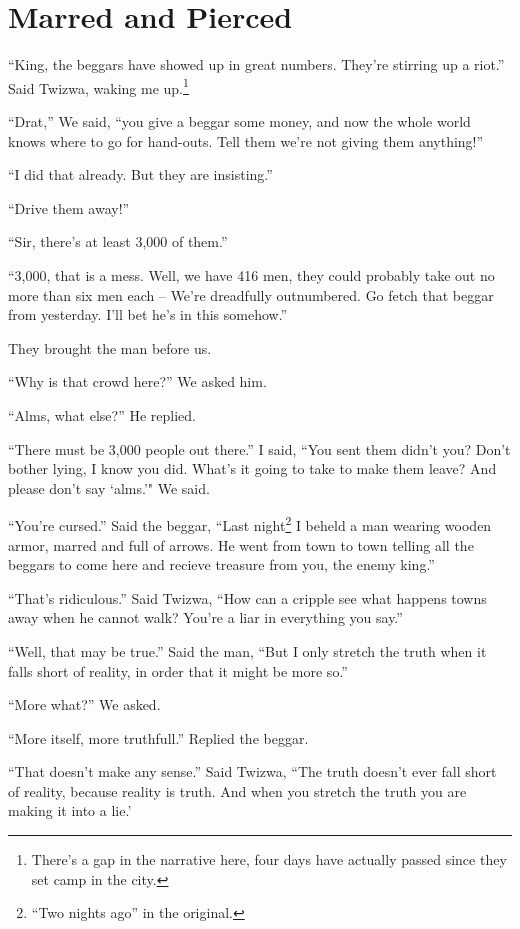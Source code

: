 \chapter {Marred and Pierced}

``King, the beggars have showed up in great numbers. They're stirring up a riot.'' Said Twizwa, waking me up.\footnote{There's a gap in the narrative here, four days have actually passed since they set camp in the city.}

``Drat,'' We said, ``you give a beggar some money, and now the whole world knows where to go for hand-outs. Tell them we're not giving them anything!''

``I did that already. But they are insisting.''

``Drive them away!''

``Sir, there's at least 3,000 of them.''

 ``3,000, that is a mess. Well, we have 416 men, they could probably take out no more than six men each -- We're dreadfully outnumbered. Go fetch that beggar from yesterday. I'll bet he's in this somehow.''

They brought the man before us.

``Why is that crowd here?'' We asked him.

``Alms, what else?'' He replied.

``There must be 3,000 people out there.'' I said, ``You sent them didn't you? Don't bother lying, I know you did. What's it going to take to make them leave? And please don't say `alms.'" We said.

``You're cursed.'' Said the beggar, ``Last night\footnote{``Two nights ago'' in the original.} I beheld a man wearing wooden armor, marred and full of arrows. He went from town to town telling all the beggars to come here and recieve treasure from you, the enemy king.''

``That's ridiculous.'' Said Twizwa, ``How can a cripple see what happens towns away when he cannot walk? You're a liar in everything you say.''

``Well, that may be true.'' Said the man, ``But I only stretch the truth when it falls short of reality, in order that it might be more so.''

``More what?'' We asked.

``More itself, more truthfull.'' Replied the beggar.

``That doesn't make any sense.'' Said Twizwa, ``The truth doesn't ever fall short of reality, because reality is truth. And when you stretch the truth you are making it into a lie.'

